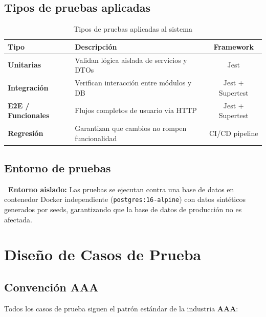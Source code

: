\documentclass[12pt, letterpaper]{article}
\begin{document}
\subsection{Tipos de pruebas aplicadas}

\begin{table}[h!]
\centering
\renewcommand{\arraystretch}{1.4}
\begin{tabular}{>{\bfseries}l l c}
\toprule
\textcolor{lasalleBlue}{Tipo} & \textcolor{lasalleBlue}{Descripción} &
\textcolor{lasalleBlue}{Framework} \\
\midrule
Unitarias      & Validan lógica aislada de servicios y DTOs   & Jest \\
Integración    & Verifican interacción entre módulos y DB      & Jest + Supertest \\
E2E / Funcionales & Flujos completos de usuario via HTTP       & Jest + Supertest \\
Regresión      & Garantizan que cambios no rompen funcionalidad & CI/CD pipeline \\
\bottomrule
\end{tabular}
\caption{Tipos de pruebas aplicadas al sistema}
\end{table}

\subsection{Entorno de pruebas}

\begin{successbox}
  \textbf{\faServer\ Entorno aislado:} Las pruebas se ejecutan contra una base de datos en
  contenedor Docker independiente (\texttt{postgres:16-alpine}) con datos sintéticos generados
  por seeds, garantizando que la base de datos de producción no es afectada.
\end{successbox}

\section{Diseño de Casos de Prueba}

\subsection{Convención AAA}

Todos los casos de prueba siguen el patrón estándar de la industria \textbf{AAA}:
\end{document}
